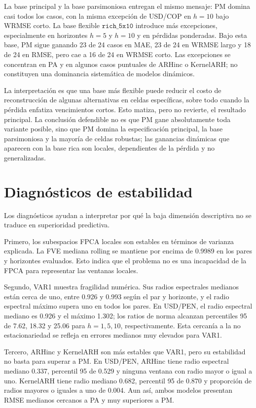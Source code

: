 \documentclass[a4paper,11pt]{article}
\begin{document}
La base principal y la base parsimoniosa entregan el mismo mensaje: PM domina casi todos los casos, con la misma excepción de USD/COP en \(h=10\) bajo WRMSE corto. La base flexible \(\texttt{rich\_5x10}\) introduce más excepciones, especialmente en horizontes \(h=5\) y \(h=10\) y en pérdidas ponderadas. Bajo esta base, PM sigue ganando 23 de 24 casos en MAE, 23 de 24 en WRMSE largo y 18 de 24 en RMSE, pero cae a 16 de 24 en WRMSE corto. Las excepciones se concentran en PA y en algunos casos puntuales de ARHinc o KernelARH; no constituyen una dominancia sistemática de modelos dinámicos.

La interpretación es que una base más flexible puede reducir el costo de reconstrucción de algunas alternativas en celdas específicas, sobre todo cuando la pérdida enfatiza vencimientos cortos. Esto matiza, pero no revierte, el resultado principal. La conclusión defendible no es que PM gane absolutamente toda variante posible, sino que PM domina la especificación principal, la base parsimoniosa y la mayoría de celdas robustas; las ganancias dinámicas que aparecen con la base rica son locales, dependientes de la pérdida y no generalizadas.

\section{Diagnósticos de estabilidad}

Los diagnósticos ayudan a interpretar por qué la baja dimensión descriptiva no se traduce en superioridad predictiva.

Primero, los subespacios FPCA locales son estables en términos de varianza explicada. La FVE mediana rolling se mantiene por encima de 0.9989 en los pares y horizontes evaluados. Esto indica que el problema no es una incapacidad de la FPCA para representar las ventanas locales.

Segundo, VAR1 muestra fragilidad numérica. Sus radios espectrales medianos están cerca de uno, entre 0.926 y 0.993 según el par y horizonte, y el radio espectral máximo supera uno en todos los pares. En USD/PEN, el radio espectral mediano es 0.926 y el máximo 1.302; los ratios de norma alcanzan percentiles 95 de 7.62, 18.32 y 25.06 para \(h=1,5,10\), respectivamente. Esta cercanía a la no estacionariedad se refleja en errores medianos muy elevados para VAR1.

Tercero, ARHinc y KernelARH son más estables que VAR1, pero su estabilidad no basta para superar a PM. En USD/PEN, ARHinc tiene radio espectral mediano 0.337, percentil 95 de 0.529 y ninguna ventana con radio mayor o igual a uno. KernelARH tiene radio mediano 0.682, percentil 95 de 0.870 y proporción de radios mayores o iguales a uno de 0.004. Aun así, ambos modelos presentan RMSE medianos cercanos a PA y muy superiores a PM.
\end{document}
